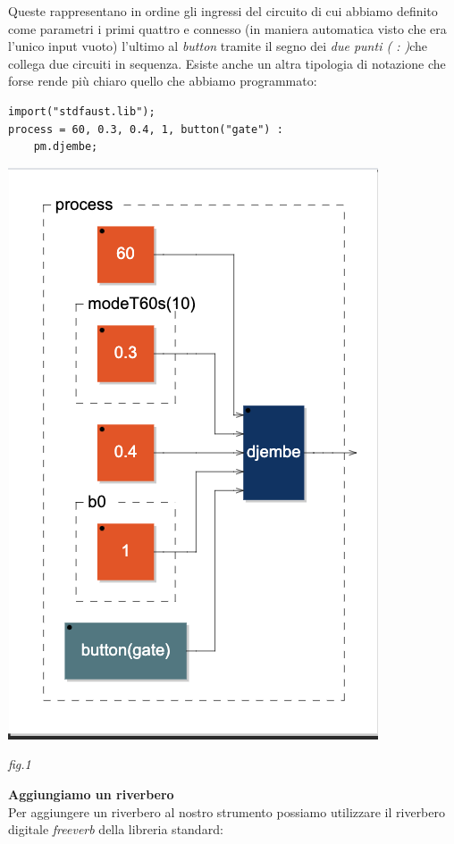 \documentclass[11pt]{article}
\begin{document}
\begin{multicols*}{2}
Queste rappresentano in ordine gli ingressi del circuito di cui abbiamo definito come parametri i primi quattro e connesso (in maniera automatica visto che era l'unico input vuoto) l'ultimo al \textit{button} tramite il segno dei \textit{due punti ( : )}che collega due circuiti in sequenza. Esiste anche un altra tipologia di notazione che forse rende più chiaro quello che abbiamo programmato:

\begin{Verbatim}[fontsize=\footnotesize]
import("stdfaust.lib");
process = 60, 0.3, 0.4, 1, button("gate") : 
    pm.djembe;
\end{Verbatim}

\begin{center}
\includegraphics[scale=0.5]{img/01.png}

{\scriptsize \emph{fig.1 }}
\end{center}

\textbf{Aggiungiamo un riverbero}\\

Per aggiungere un riverbero al nostro strumento possiamo utilizzare il riverbero digitale \textit{freeverb} della libreria standard:


\end{multicols*}
\end{document}
